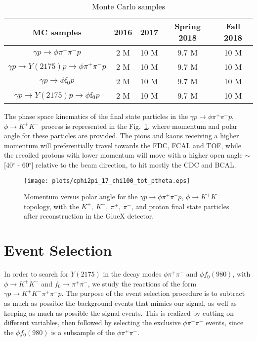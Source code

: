 \begin{table}[H]
    \centering
    \caption{Monte Carlo samples}
    \label{tab.y2175.data_mc.mc}
    \begin{tabular}{|c|c|c|c|c|}
        \hline
        MC samples & 2016 & 2017 & Spring 2018 & Fall 2018 \\
        \hline
        $\gamma p \rightarrow \phi \pi^+ \pi^- p$ & 2 M & 10 M & 9.7 M & 10 M \\
        \hline
        $\gamma p \rightarrow Y(2175) p \rightarrow \phi \pi^+ \pi^- p$ & 2 M & 10 M & 9.7 M & 10 M \\
        \hline
        $\gamma p \rightarrow \phi \mathrm{f}_0 p$ & 2 M & 10 M & 9.7 M & 10 M \\
        \hline
        $\gamma p \rightarrow Y(2175) p \rightarrow \phi \mathrm{f}_0 p$ & 2 M & 10 M & 9.7 M & 10 M \\
        \hline
    \end{tabular}
\end{table}

The phase space kinematics of the final state particles in the $\gamma p \rightarrow \phi \pi^+ \pi^- p$, $\phi \rightarrow K^+ K^-$ process is represented in the Fig.~\ref{fig.y2175.data_mc.mc}, where momentum and polar angle for these particles are provided. The pions and kaons receiving a higher momentum will preferentially travel towards the FDC, FCAL and TOF, while the recoiled protons with lower momentum will move with a higher open angle $\sim$ [40$^{\circ}$ - 60$^{\circ}$] relative to the beam direction, to hit mostly the CDC and BCAL.

\begin{figure}[H]
    \centering
        \texttt{[image: plots/cphi2pi\_17\_chi100\_tot\_ptheta.eps]}
        \caption{Momentum versus polar angle for the $\gamma p \rightarrow \phi \pi^+ \pi^- p$, $\phi \rightarrow K^+ K^-$ topology, with the $K^{+},~K^{-},~\pi^{+},~\pi^{-}$, and proton final state particles after reconstruction in the GlueX detector.}
        \label{fig.y2175.data_mc.mc}
\end{figure}

\section{Event Selection}
\label{chap.y2175.evt_sel}

In order to search for $Y(2175)$ in the decay modes $\phi \pi^+ \pi^-$ and $\phi f_0(980)$, with $\phi \rightarrow K^+ K^- $ and $f_0 \rightarrow \pi^+ \pi^-$, we study the reactions of the form $\gamma p \rightarrow K^+ K^- \pi^+ \pi^- p$. The purpose of the event selection procedure is to subtract as much as possible the background events that mimics our signal, as well as keeping as much as possible the signal events. This is realized by cutting on different variables, then followed by selecting the exclusive $\phi \pi^+ \pi^-$ events, since the $\phi f_0(980)$ is a subsample of the $\phi \pi^+ \pi^-$.

